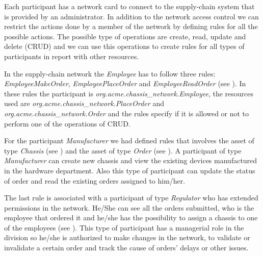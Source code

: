 
Each participant has a network card to connect to the supply-chain system that is provided by an administrator. In addition to the network access control we can restrict the actions done by a member of the network by defining rules for all the possible actions. The possible type of operations are create, read, update and delete (CRUD) and we can use this operations to create rules for all types of participants in report with other resources. 

In the supply-chain network the \emph{Employee} has to follow three rules: \emph{EmployeeMakeOrder}, \emph{EmployeePlaceOrder} and \emph{EmployeeReadOrder}
(see ). In these rules the participant is \emph{org.acme.chassis_network.Employee}, the resources used are \emph{org.acme.chassis_network.PlaceOrder} and \emph{org.acme.chassis_network.Order} and the rules specify if it is allowed or not to perform one of the operations of CRUD. 


For the participant \emph{Manufacturer} we had defined rules that involves the asset of type \emph{Chassis} (see ) and the asset of type \emph{Order} (see ). A participant of type \emph{Manufacturer} can create new chassis and view the existing devices manufactured in the hardware department. Also this type of participant can update the status of order and read the existing orders assigned to him/her.



The last rule is associated with a participant of type \emph{Regulator} who has extended permissions in the network. He/She can see all the orders submitted, who is the employee that ordered it and he/she has the possibility to assign a chassis to one of the employees (see ). This type of participant has a managerial role in the division so he/she is authorized to make changes in the network, to validate or invalidate a certain order and track the cause of orders' delays or other issues.

